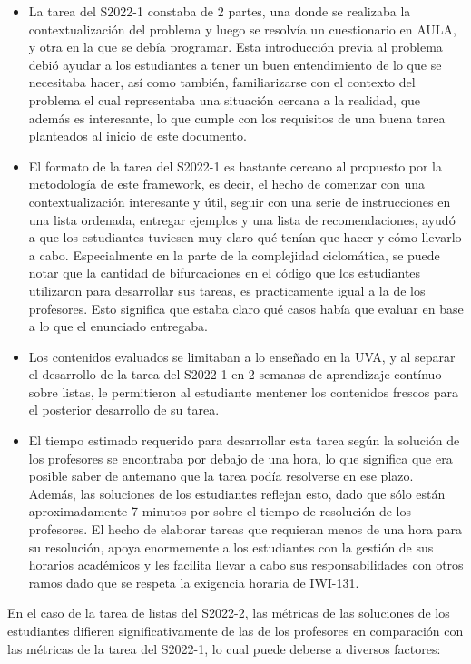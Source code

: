 \documentclass[letterpaper,12pt]{article}
\begin{document}
\begin{itemize}
  \item La tarea del S2022-1 constaba de 2 partes, una donde se realizaba la contextualización del problema y luego se resolvía un cuestionario en AULA, y otra en la que se debía programar. Esta introducción previa al problema debió ayudar a los estudiantes a tener un buen entendimiento de lo que se necesitaba hacer, así como también, familiarizarse con el contexto del problema el cual representaba una situación cercana a la realidad, que además es interesante, lo que cumple con los requisitos de una buena tarea planteados al inicio de este documento.
  \item El formato de la tarea del S2022-1 es bastante cercano al propuesto por la metodología de este framework, es decir, el hecho de comenzar con una contextualización interesante y útil, seguir con una serie de instrucciones en una lista ordenada, entregar ejemplos y una lista de recomendaciones, ayudó a que los estudiantes tuviesen muy claro qué tenían que hacer y cómo llevarlo a cabo. Especialmente en la parte de la complejidad ciclomática, se puede notar que la cantidad de bifurcaciones en el código que los estudiantes utilizaron para desarrollar sus tareas, es practicamente igual a la de los profesores. Esto significa que estaba claro qué casos había que evaluar en base a lo que el enunciado entregaba.
  \item Los contenidos evaluados se limitaban a lo enseñado en la UVA, y al separar el desarrollo de la tarea del S2022-1 en 2 semanas de aprendizaje contínuo sobre listas, le permitieron al estudiante mentener los contenidos frescos para el posterior desarrollo de su tarea.
  \item El tiempo estimado requerido para desarrollar esta tarea según la solución de los profesores se encontraba por debajo de una hora, lo que significa que era posible saber de antemano que la tarea podía resolverse en ese plazo. Además, las soluciones de los estudiantes reflejan esto, dado que sólo están aproximadamente 7 minutos por sobre el tiempo de resolución de los profesores. El hecho de elaborar tareas que requieran menos de una hora para su resolución, apoya enormemente a los estudiantes con la gestión de sus horarios académicos y les facilita llevar a cabo sus responsabilidades con otros ramos dado que se respeta la exigencia horaria de IWI-131.
\end{itemize}

En el caso de la tarea de listas del S2022-2, las métricas de las soluciones de los estudiantes difieren significativamente de las de los profesores en comparación con las métricas de la tarea del S2022-1, lo cual puede deberse a diversos factores:
\end{document}
